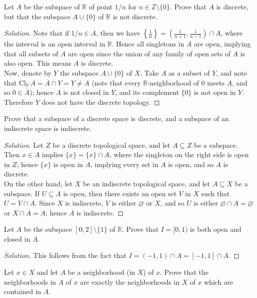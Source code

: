 \documentclass[12pt]{article}
\newenvironment{problem}[2][Problem]{\begin{trivlist}
\item[\hskip \labelsep {\bfseries #1}\hskip \labelsep {\bfseries #2.}]}{\end{trivlist}}
\newcommand{\Cl}[2]{\text{Cl}_{#1}\,#2}
\newenvironment{solution}
  {\renewcommand\qedsymbol{$\blacksquare$}\begin{proof}[Solution]}
{\end{proof}}
\begin{document}
\begin{problem}{3}
  Let $A$ be the subspace of $\mathbb{R}$ of point $1/n$ for 
  $n\in\mathbb{Z}\setminus\{0\}$.
  Prove that $A$ is discrete, but that the subspace $A\cup\{0\}$ of
  $\mathbb{R}$ is not discrete.
\end{problem}
\begin{solution}
  Note that if $1/n\in A$, then we have 
  $\displaystyle{\left\{\frac{1}{n}\right\}=\left(\frac{1}{n+1}, \frac{1}{n-1}\right)\cap A}$, where the interval
  is an open interval in $\mathbb{R}$.
  Hence all singletons in $A$ are open, implying that all subsets of $A$
  are open since the union of any family of open sets of $A$ is also open.
  This means $A$ is discrete.\\
  \indent Now, denote by $Y$ the subspace $A\cup\{0\}$ of $X$.
  Take $A$ as a subset of $Y$, and note that 
  $\Cl{Y}{A}=\overline{A}\cap Y = Y\neq A$ (note that every 
  $\mathbb{R}$-neighborhood of $0$ meets $A$, and so $0\in\overline{A}$);
  hence $A$ is not closed in $Y$, and its complement $\{0\}$ is not
  open in $Y$.
  Therefore $Y$ does not have the discrete topology.
\end{solution}

\begin{problem}{4}
  Prove that a subspace of a discrete space is discrete, and a subspace of an indiscrete space is indiscrete.
\end{problem}
\begin{solution}
  Let $Z$ be a discrete topological space, and let $A\subseteq Z$ 
  be a subspace.
  Then $x\in A$ implies $\{x\}=\{x\}\cap A$, where the singleton on the right
  side is open in $Z$; hence $\{x\}$ is open in $A$, implying every set in
  $A$ is open, and so $A$ is discrete.\\
  \indent On the other hand, let $X$ be an indiscrete topological space,
  and let $A\subseteq X$ be a subspace. 
  If $U\subseteq A$ is open, then there exists an open set $V$ in $X$
  such that $U=V\cap A$.
  Since $X$ is indiscrete, $V$ is either $\varnothing$ or $X$, and so
  $U$ is either $\varnothing\cap A=\varnothing$ or $X\cap A=A$;
  hence $A$ is indiscrete.
\end{solution}
  
\begin{problem}{5}
  Let $A$ be the subspace $[0,2]\setminus\{1\}$ of $\mathbb{R}$.
  Prove that $I=[0,1)$ is both open and closed in $A$.
\end{problem}
\begin{solution}
  This follows from the fact that $I=(-1, 1)\cap A=[-1,1]\cap A$. 
\end{solution}

\begin{problem}{6}
  Let $x\in X$ and let $A$ be a neighborhood (in $X$) of $x$.
  Prove that the neighborhoods in $A$ of $x$ are exactly the
  neighborhoods in $X$ of $x$ which are contained in $A$.
\end{problem}<++>
\end{document}
